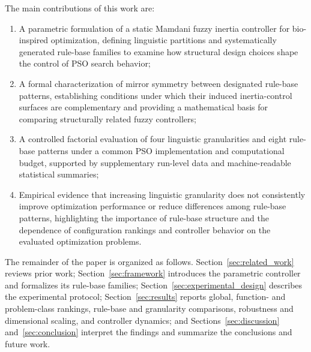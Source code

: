 The main contributions of this work are:
\begin{enumerate}
    \item A parametric formulation of a static Mamdani fuzzy inertia controller for bio-inspired optimization, defining linguistic partitions and systematically generated rule-base families to examine how structural design choices shape the control of PSO search behavior;

    \item A formal characterization of mirror symmetry between designated rule-base patterns, establishing conditions under which their induced inertia-control surfaces are complementary and providing a mathematical basis for comparing structurally related fuzzy controllers;

    \item A controlled factorial evaluation of four linguistic granularities and eight rule-base patterns under a common PSO implementation and computational budget, supported by supplementary run-level data and machine-readable statistical summaries;

    \item Empirical evidence that increasing linguistic granularity does not consistently improve optimization performance or reduce differences among rule-base patterns, highlighting the importance of rule-base structure and the dependence of configuration rankings and controller behavior on the evaluated optimization problems.
\end{enumerate}


The remainder of the paper is organized as follows. Section~\ref{sec:related_work} reviews prior work; Section~\ref{sec:framework} introduces the parametric controller and formalizes its rule-base families; Section~\ref{sec:experimental_design} describes the experimental protocol; Section~\ref{sec:results} reports global, function- and problem-class rankings, rule-base and granularity comparisons, robustness and dimensional scaling, and controller dynamics; and Sections~\ref{sec:discussion} and~\ref{sec:conclusion} interpret the findings and summarize the conclusions and future work.
